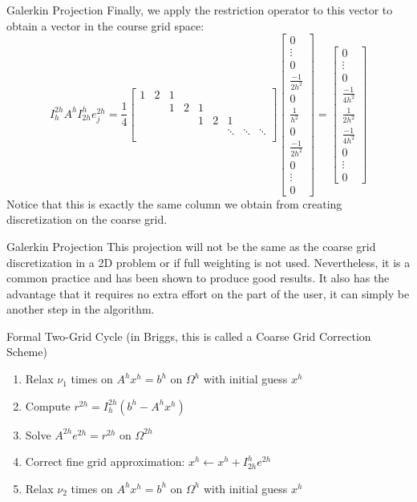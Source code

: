 \documentclass[11pt]{beamer}
\begin{document}
\begin{frame}{Galerkin Projection}
  Finally, we apply the restriction operator to this vector to obtain a vector in the course grid space: \[
    I_{h}^{2h} A^{h} I_{2h}^h e_j^{2h} = \frac{1}{4}
    \begin{bmatrix}
      1 & 2 & 1 & & & & & & \\
      & & 1 & 2 & 1 & & & &  \\
      & & & & 1 & 2 & 1 & &  \\
      & & & &             &             & \ddots          & \ddots & \ddots \\
    \end{bmatrix}
    \begin{bmatrix}
      0 \\ \vdots \\ 0 \\ \frac{-1}{2h^2} \\ 0 \\ \frac{1}{h^2} \\ 0 \\ \frac{-1}{2h^2} \\ 0 \\ \vdots \\ 0
    \end{bmatrix}
    =
    \begin{bmatrix}
      0 \\ \vdots \\ 0 \\ \frac{-1}{4h^2} \\ \frac{1}{2h^2} \\ \frac{-1}{4h^2} \\ 0 \\ \vdots \\ 0
    \end{bmatrix}
  \] Notice that this is exactly the same column we obtain from creating discretization on the coarse grid.
\end{frame}
\begin{frame}{Galerkin Projection}
  This projection will not be the same
  as the coarse grid discretization in a 2D problem or if full weighting
  is not used. Nevertheless, it is a common practice and has been shown to
  produce good results. It also has the advantage that it requires no
  extra effort on the part of the user, it can simply be another step in
  the algorithm.
\end{frame}
\begin{frame}{Formal Two-Grid Cycle}
  (in Briggs, this is called a Coarse Grid Correction Scheme)
  \begin{enumerate}
  \item Relax \(\nu_1\) times on \(A^h x^h = b^h\) on \(\Omega^h\) with initial guess
    \(x^h\)
  \item Compute \(r^{2h} = I_h^{2h}(b^h - A^h x^h)\)
  \item Solve \(A^{2h} e^{2h} = r^{2h}\) on \(\Omega^{2h}\)
  \item Correct fine grid approximation: \(x^h \leftarrow x^h + I_{2h}^h e^{2h}\)
  \item Relax \(\nu_2\) times on \(A^h x^h = b^h\) on \(\Omega^h\) with initial guess
    \(x^h\)
  \end{enumerate}
\end{frame}
\end{document}
